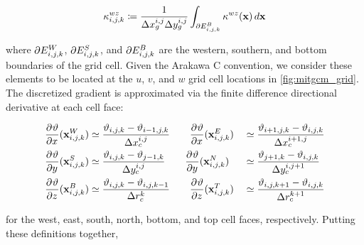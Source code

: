 \begin{linenomath*}\begin{equation*}
    \kappa^{wz}_{{i,j,k}} \coloneqq \dfrac{1}{\Delta x_g^{i,j}\Delta y_g^{i,j}}
    \int_{\partial E_{{i,j,k}}^{B}} \kappa^{wz}(\mathbf{x})\,d\mathbf{x}
\end{equation*}\end{linenomath*}
where $\partial E_{{i,j,k}}^{W}$, $\partial E_{{i,j,k}}^{S}$, and $\partial E_{{i,j,k}}^{B}$ are the
western, southern, and bottom boundaries of the grid cell.
Given the Arakawa C convention, we consider these elements to be
located at the $u$, $v$, and $w$ grid cell locations in \cref{fig:mitgcm_grid}.
The discretized gradient is approximated via the finite difference
directional derivative at each cell face:
\begin{linenomath*}\begin{equation*}
    \begin{aligned}
        \frac{\partial^{} {\vartheta}}{\partial {x}^{}}(\mathbf{x}_{i,j,k}^W)
        &\simeq \dfrac{\vartheta_{i,j,k} - \vartheta_{i-1,j,k}}{\Delta x_c^{i,j}}
        \qquad
        \frac{\partial^{} {\vartheta}}{\partial {x}^{}}(\mathbf{x}_{i,j,k}^E)
        &&\simeq \dfrac{\vartheta_{i+1,j,k} - \vartheta_{i,j,k}}{\Delta x_c^{i+1,j}}
        \\
        \frac{\partial^{} {\vartheta}}{\partial {y}^{}}(\mathbf{x}_{i,j,k}^S)
        &\simeq \dfrac{\vartheta_{i,j,k} - \vartheta_{j-1,k}}{\Delta y_c^{i,j}}
        \qquad
        \frac{\partial^{} {\vartheta}}{\partial {y}^{}}(\mathbf{x}_{i,j,k}^N)
        &&\simeq \dfrac{\vartheta_{j+1,k} - \vartheta_{i,j,k}}{\Delta y_c^{i,j+1}}
        \\
        \frac{\partial^{} {\vartheta}}{\partial {z}^{}}(\mathbf{x}_{i,j,k}^B)
        &\simeq \dfrac{\vartheta_{i,j,k} - \vartheta_{i,j,k-1}}{\Delta r_c^{k}}
        \qquad
        \frac{\partial^{} {\vartheta}}{\partial {z}^{}}(\mathbf{x}_{i,j,k}^T)
        &&\simeq \dfrac{\vartheta_{i,j,k+1} - \vartheta_{i,j,k}}{\Delta r_c^{k+1}}
    \end{aligned}
\end{equation*}\end{linenomath*}
for the west, east, south, north, bottom, and top cell faces, respectively.
Putting these definitions together,
